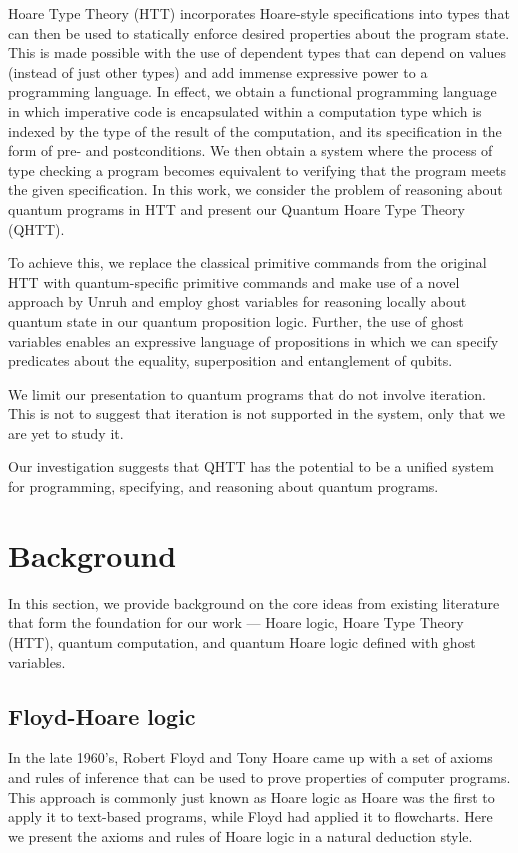\documentclass[adraft,creativecommons]{eptcs}
\theoremstyle{definition}
\theoremstyle{remark}
\begin{document}
Hoare Type Theory (HTT) incorporates Hoare-style specifications into types that can then be used to statically enforce desired properties about the program state. This is made possible with the use of dependent types that can depend on values (instead of just other types) and add immense expressive power to a programming language. In effect, we obtain a functional programming language in which imperative code is encapsulated within a computation type which is indexed by the type of the result of the computation, and its specification in the form of pre- and postconditions. We then obtain a system where the process of type checking a program becomes equivalent to verifying that the program meets the given specification. In this work, we consider the problem of reasoning about quantum programs in HTT and present our Quantum Hoare Type Theory (QHTT).

To achieve this, we replace the classical primitive commands from the original HTT with quantum-specific primitive commands and make use of a novel approach by Unruh \cite{unruh2019} and employ ghost variables for reasoning locally about quantum state in our quantum proposition logic. Further, the use of ghost variables enables an expressive language of propositions in which we can specify predicates about the equality, superposition and entanglement of qubits.

We limit our presentation to quantum programs that do not involve iteration. This is not to suggest that iteration is not supported in the system, only that we are yet to study it.

Our investigation suggests that QHTT has the potential to be a unified system for programming, specifying, and reasoning about quantum programs.

\section{Background}
In this section, we provide background on the core ideas from existing literature that form the foundation for our work --- Hoare logic, Hoare Type Theory (HTT), quantum computation, and quantum Hoare logic defined with ghost variables.

\subsection{Floyd-Hoare logic}
In the late 1960's, Robert Floyd and Tony Hoare came up with a set of axioms and rules of inference that can be used to prove properties of computer programs. This approach is commonly just known as Hoare logic as Hoare was the first to apply it to text-based programs, while Floyd had applied it to flowcharts. Here we present the axioms and rules of Hoare logic in a natural deduction style.
\end{document}
